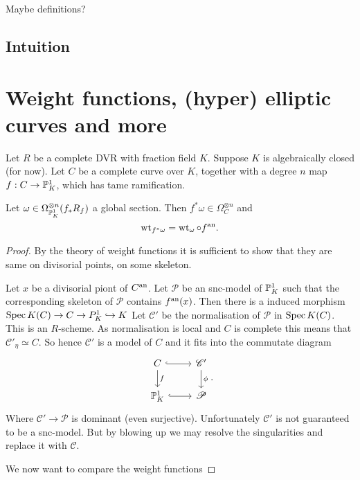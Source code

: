 Maybe definitions?

\subsection{Intuition} \label{sec:intuition}





\section{Weight functions, (hyper) elliptic curves and more} \label{sec:weight_functions,_(hyper)_elliptic_curves_and_more}

Let $R$ be a complete DVR with fraction field $K$. 
Suppose $K$ is algebraically closed (for now). 
Let $C$ be a complete curve over $K$, together with a degree $n$ map $f: C\to \mathbb{P}^{1}_K$, which has tame ramification. 
\begin{proposition}
Let $\omega \in \Omega _{\mathbb{P}^{1}_K}^{\otimes n}(f_* R_f)$ a global section. 
Then  $f^* \omega \in \Omega^{\otimes n}_{C}$ and \[
\operatorname{wt}_{f^* \omega} = \operatorname{wt}_{\omega} \circ f^{\text{an}}
.\] 
\end{proposition}

\begin{proof}
	By the theory of weight functions it is sufficient to show that they are same on divisorial points, on some skeleton. 

	Let $x$ be a divisorial piont of $C{}^{\text{an}}$.
	Let $\mathscr{P} $ be an snc-model of $\mathbb{P}^{1}_K$ such that the corresponding skeleton of $\mathscr P$ contains $f{}^{\text{an}} (x)$. 
	Then there is a induced morphism $\operatorname{Spec} K(C) \to C \to P^{1}_K \hookrightarrow K$
	Let $\mathscr{C}'$ be the normalisation of $\mathcal{P} $ in $\operatorname{Spec} K(C)$. 
	This is an $R$-scheme.
	As normalisation is local and  $C$ is complete this means that $\mathcal{C}' _\eta \simeq C$. 
	So hence $\mathscr{C}' $ is a model of $C$ and it fits into the commutate  diagram \[
	\begin{tikzcd}
		C \rar[hookrightarrow] \dar{f} & \mathscr C '\dar{\phi} \\
		\pro^{1}_K \rar[hookrightarrow] & \mathscr P
	\end{tikzcd}
	.\] 
	Where $\mathscr C' \to \mathscr P$ is dominant (even surjective). 
	Unfortunately  $\mathscr C'$ is not guaranteed to be a snc-model. 
	But by blowing up we may resolve the singularities and replace it with $\mathscr C$. 
	
	We now want to compare the weight functions 


\end{proof}



